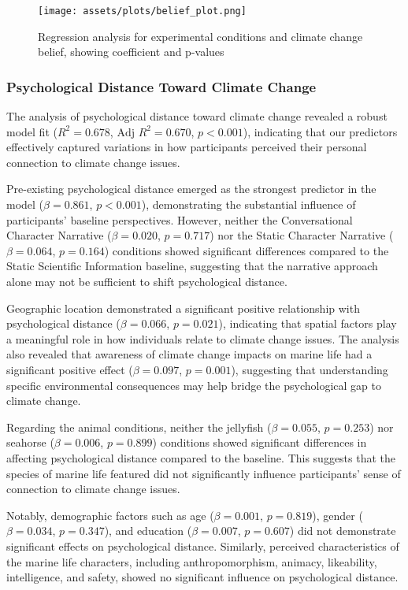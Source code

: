 \documentclass[sigconf, nonacm]{acmart}
\begin{document}
\begin{figure}
    \centering
    \texttt{[image: assets/plots/belief\_plot.png]}
    \caption{Regression analysis for experimental conditions and climate change belief, showing coefficient and p-values}
    \label{fig:belief_post}
\end{figure}

\subsubsection{Psychological Distance Toward Climate Change}

The analysis of psychological distance toward climate change revealed a robust model fit ($R^2 = 0.678$, $\text{Adj } R^2 = 0.670$, $p < 0.001$), indicating that our predictors effectively captured variations in how participants perceived their personal connection to climate change issues.

Pre-existing psychological distance emerged as the strongest predictor in the model ($\beta = 0.861$, $p < 0.001$), demonstrating the substantial influence of participants' baseline perspectives. However, neither the Conversational Character Narrative ($\beta = 0.020$, $p = 0.717$) nor the Static Character Narrative ($\beta = 0.064$, $p = 0.164$) conditions showed significant differences compared to the Static Scientific Information baseline, suggesting that the narrative approach alone may not be sufficient to shift psychological distance.

Geographic location demonstrated a significant positive relationship with psychological distance ($\beta = 0.066$, $p = 0.021$), indicating that spatial factors play a meaningful role in how individuals relate to climate change issues. The analysis also revealed that awareness of climate change impacts on marine life had a significant positive effect ($\beta = 0.097$, $p = 0.001$), suggesting that understanding specific environmental consequences may help bridge the psychological gap to climate change.

Regarding the animal conditions, neither the jellyfish ($\beta = 0.055$, $p = 0.253$) nor seahorse ($\beta = 0.006$, $p = 0.899$) conditions showed significant differences in affecting psychological distance compared to the baseline. This suggests that the species of marine life featured did not significantly influence participants' sense of connection to climate change issues.

Notably, demographic factors such as age ($\beta = 0.001$, $p = 0.819$), gender ($\beta = 0.034$, $p = 0.347$), and education ($\beta = 0.007$, $p = 0.607$) did not demonstrate significant effects on psychological distance. Similarly, perceived characteristics of the marine life characters, including anthropomorphism, animacy, likeability, intelligence, and safety, showed no significant influence on psychological distance.
\end{document}

